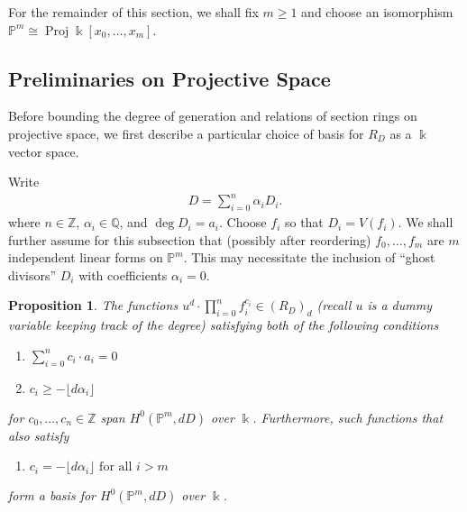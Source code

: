\documentclass{amsart}
\theoremstyle{plain}
\newtheorem{prop}[thm]{Proposition}
\theoremstyle{definition}
\theoremstyle{remark}
\numberwithin{equation}{subsection}
\newcommand\ssec{\subsection}
\newcommand\bq{{\mathbb Q}}
\newcommand\bp{{\mathbb P}}
\newcommand\bz{{\mathbb Z}}
\newcommand\bk{{\Bbbk}}
\newcommand\bida{a}
\DeclareMathOperator{\proj}{Proj}
\begin{document}
For the remainder of this section, we shall fix $m \geq 1$ and
choose an
isomorphism $\bp^m \cong \proj \bk[x_0, \ldots, x_m]$.

\ssec{Preliminaries on Projective Space}
Before bounding the degree of generation and relations of
section rings on projective space, we first
describe a particular choice of basis for $R_D$ as a $\bk$ vector
space.

Write \begin{align*}
	D = \sum_{i=0}^{n}\alpha_i D_i.
\end{align*}
where $n \in \bz$, $\alpha_i \in \bq$, and $\deg D_i = \bida_i$. 
Choose $f_i$ so that $D_i = V(f_i)$.
We shall further assume for this subsection that (possibly after
reordering) $f_0,\ldots, f_{m}$ are $m$ independent linear forms
on $\bp^m$.  This may necessitate the inclusion of ``ghost divisors'' $D_i$ with coefficients $\alpha_i = 0$. 

\begin{prop}
\label{prop:pm-span-and-basis}
The functions $u^d \cdot \prod_{i=0}^n f_i^{c_i} \in (R_D)_d$ \rm{(}recall $u$ is a dummy variable keeping
track of the degree\rm{)}
satisfying
both of the following conditions

\begin{enumerate}
	\item $\sum_{i=0}^{n} c_i \cdot \bida_i = 0$
	\item $c_i \geq - \lfloor d \alpha_i \rfloor$
\end{enumerate}

\noindent
for $c_0, \ldots, c_n \in \bz$
span $H^0(\bp^m, dD)$ over $\bk$. Furthermore, such functions 
that also satisfy
\begin{enumerate}[resume]
	\item $c_i = -\lfloor d\alpha_i \rfloor \text{ for all } i > m$
\end{enumerate}

\noindent
form a basis for $H^0(\bp^m, dD)$ over $\bk$.
\end{prop}
\end{document}
